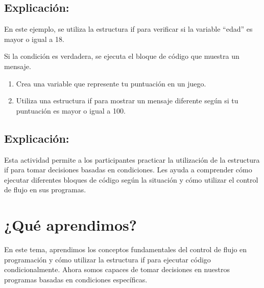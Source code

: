 \documentclass[
  a4paper,
  DIV=11,
  numbers=noendperiod,
  onepage,
  openany]{scrreprt}
\providecommand{\tightlist}{%
  \setlength{\itemsep}{0pt}\setlength{\parskip}{0pt}}\usepackage{longtable,booktabs,array}
\begin{document}
\subsection{Explicación:}\label{explicaciuxf3n-16}

En este ejemplo, se utiliza la estructura if para verificar si la
variable ``edad'' es mayor o igual a 18.

Si la condición es verdadera, se ejecuta el bloque de código que muestra
un mensaje.

\begin{tcolorbox}[enhanced jigsaw, breakable, left=2mm, arc=.35mm, colframe=quarto-callout-tip-color-frame, colbacktitle=quarto-callout-tip-color!10!white, coltitle=black, title=\textcolor{quarto-callout-tip-color}{\faLightbulb}\hspace{0.5em}{Actividad Práctica}, toprule=.15mm, leftrule=.75mm, bottomrule=.15mm, opacitybacktitle=0.6, opacityback=0, colback=white, toptitle=1mm, titlerule=0mm, rightrule=.15mm, bottomtitle=1mm]

\begin{enumerate}
\def\labelenumi{\arabic{enumi}.}
\tightlist
\item
  Crea una variable que represente tu puntuación en un juego.
\item
  Utiliza una estructura if para mostrar un mensaje diferente según si
  tu puntuación es mayor o igual a 100.
\end{enumerate}

\end{tcolorbox}

\subsection{Explicación:}\label{explicaciuxf3n-17}

Esta actividad permite a los participantes practicar la utilización de
la estructura if para tomar decisiones basadas en condiciones. Les ayuda
a comprender cómo ejecutar diferentes bloques de código según la
situación y cómo utilizar el control de flujo en sus programas.

\section{¿Qué aprendimos?}\label{quuxe9-aprendimos-3}

En este tema, aprendimos los conceptos fundamentales del control de
flujo en programación y cómo utilizar la estructura if para ejecutar
código condicionalmente. Ahora somos capaces de tomar decisiones en
nuestros programas basadas en condiciones específicas.
\end{document}
